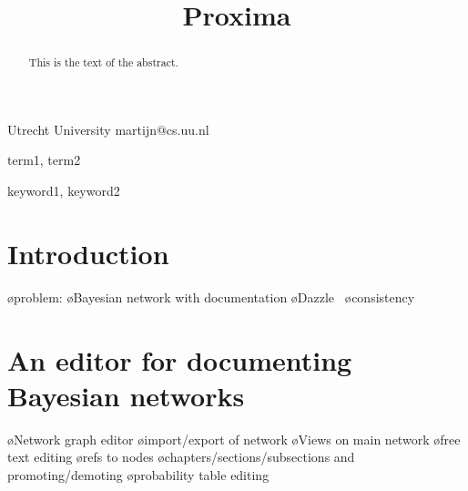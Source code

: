 \documentclass[preprint,natbib]{sigplanconf}
\begin{document}
\copyrightdata{[to be supplied]} 

\preprintfooter{\version}   %

\title{Proxima}

           {Utrecht University}
           {martijn@cs.uu.nl}

\maketitle

\begin{abstract}
This is the text of the abstract.
\end{abstract}


\terms
term1, term2

\keywords
keyword1, keyword2




\section{Introduction}

\bl
\o problem:
\o Bayesian network with documentation
\o Dazzle~\cite{schrage05Dazzle}
\o consistency
\el



\section{An editor for documenting Bayesian networks}

\bl
\o Network graph editor
\o import/export of network
\o Views on main network
\o free text editing
\o refs to nodes
\o chapters/sections/subsections and promoting/demoting
\o probability table editing
\el
\end{document}
